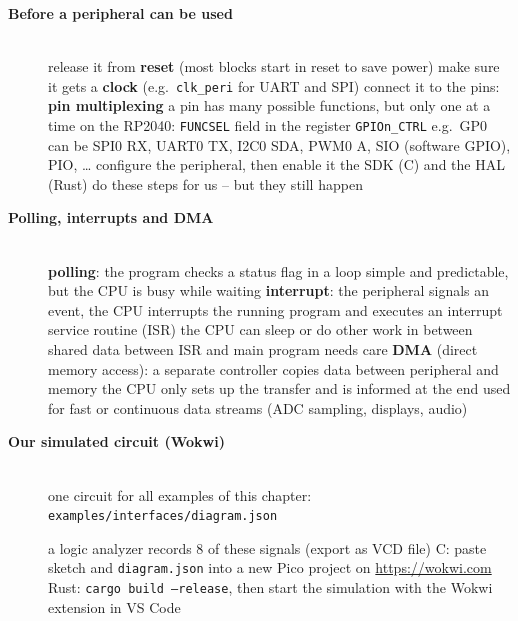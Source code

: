 \begin{description}
\item[{\rot\bf Before a peripheral can be used}]~\\[-\lblskip]
\bi
	\ite release it from \textbf{reset} (most blocks start in reset to save power)
	\ite make sure it gets a \textbf{clock} (e.g.\ \texttt{clk\_peri} for UART and SPI)
	\ite connect it to the pins: \textbf{pin multiplexing}
	\bi
		\ite a pin has many possible functions, but only one at a time
		\ite on the RP2040: \texttt{FUNCSEL} field in the register \texttt{GPIOn\_CTRL}
		\ite e.g.\ GP0 can be SPI0 RX, UART0 TX, I2C0 SDA, PWM0 A, SIO (software GPIO), PIO, \ldots
	\ei
	\ite configure the peripheral, then enable it
	\ite the SDK (C) and the HAL (Rust) do these steps for us -- but they still happen
\ei
\os{\newpage}

\item[{\rot\bf Polling, interrupts and DMA}]~\\[-\lblskip]
\bi
	\ite \textbf{polling}: the program checks a status flag in a loop
	\bi
		\ite simple and predictable, but the CPU is busy while waiting
	\ei
	\ite \textbf{interrupt}: the peripheral signals an event, the CPU interrupts the running program and executes an interrupt service routine (ISR)
	\bi
		\ite the CPU can sleep or do other work in between
		\ite shared data between ISR and main program needs care
	\ei
	\ite \textbf{DMA} (direct memory access): a separate controller copies data between peripheral and memory
	\bi
		\ite the CPU only sets up the transfer and is informed at the end
		\ite used for fast or continuous data streams (ADC sampling, displays, audio)
	\ei
\ei
\os{\newpage}

\item[{\rot\bf Our simulated circuit (Wokwi)}]~\\[-\lblskip]
\bi
	\ite one circuit for all examples of this chapter: \texttt{examples/interfaces/diagram.json}
\ei
\begin{center}
\end{center}
\bi
	\ite a logic analyzer records 8 of these signals (export as VCD file)
	\ite C: paste sketch and \texttt{diagram.json} into a new Pico project on \url{https://wokwi.com}
	\ite Rust: \texttt{cargo build --release}, then start the simulation with the Wokwi extension in VS Code
\ei
\os{\newpage}
\end{description}

